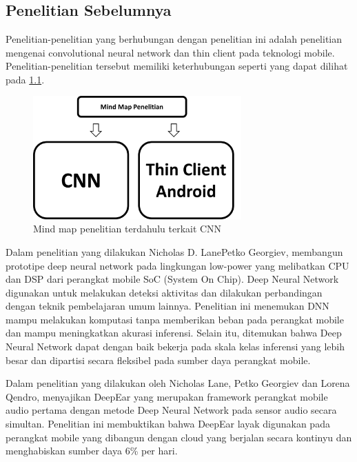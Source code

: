 \chapter{\babDua}
\section{Penelitian Sebelumnya}
Penelitian-penelitian yang berhubungan dengan penelitian ini adalah penelitian mengenai convolutional neural network dan thin client pada teknologi mobile. Penelitian-penelitian tersebut memiliki keterhubungan seperti yang dapat dilihat pada \ref{fig:mind_map}.\\
\begin{figure}[htp]
	\centering
	\includegraphics[width=8cm]{pics/mind_map_final}
	\caption{Mind map penelitian terdahulu terkait CNN}
	\label{fig:mind_map}
\end{figure}

Dalam penelitian \cite{can_deep_learning} yang dilakukan Nicholas D. LanePetko Georgiev, membangun prototipe deep neural network pada lingkungan low-power yang melibatkan CPU dan DSP dari perangkat mobile SoC (System On Chip). Deep Neural Network digunakan untuk melakukan deteksi aktivitas dan dilakukan perbandingan dengan teknik pembelajaran umum lainnya. Penelitian ini menemukan DNN mampu melakukan komputasi tanpa memberikan beban pada perangkat mobile dan mampu meningkatkan akurasi inferensi. Selain itu, ditemukan bahwa Deep Neural Network dapat dengan baik bekerja pada skala kelas inferensi yang lebih besar dan dipartisi secara fleksibel pada sumber daya perangkat mobile.

Dalam penelitian \cite{deepear} yang dilakukan oleh Nicholas Lane, Petko Georgiev dan Lorena Qendro, menyajikan DeepEar yang merupakan framework perangkat mobile audio pertama dengan metode Deep Neural Network pada sensor audio secara simultan. Penelitian ini membuktikan bahwa DeepEar layak digunakan pada perangkat mobile yang dibangun dengan cloud yang berjalan secara kontinyu dan menghabiskan sumber daya 6\% per hari.


